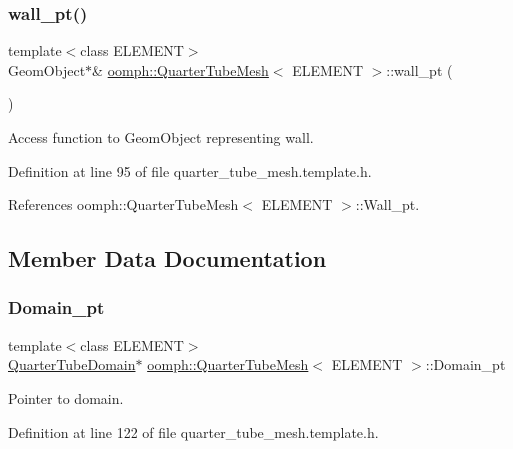 \subsubsection{\texorpdfstring{wall\+\_\+pt()}{wall\_pt()}}
{\footnotesize\ttfamily template$<$class E\+L\+E\+M\+E\+NT$>$ \\
Geom\+Object$\ast$\& \hyperlink{classoomph_1_1QuarterTubeMesh}{oomph\+::\+Quarter\+Tube\+Mesh}$<$ E\+L\+E\+M\+E\+NT $>$\+::wall\+\_\+pt (\begin{DoxyParamCaption}{ }\end{DoxyParamCaption})\hspace{0.3cm}{\ttfamily [inline]}}



Access function to Geom\+Object representing wall. 



Definition at line 95 of file quarter\+\_\+tube\+\_\+mesh.\+template.\+h.



References oomph\+::\+Quarter\+Tube\+Mesh$<$ E\+L\+E\+M\+E\+N\+T $>$\+::\+Wall\+\_\+pt.



\subsection{Member Data Documentation}
\mbox{\label{classoomph_1_1QuarterTubeMesh_a250577dc1d699b4035a42ddabd84c121}} 
\subsubsection{\texorpdfstring{Domain\+\_\+pt}{Domain\_pt}}
{\footnotesize\ttfamily template$<$class E\+L\+E\+M\+E\+NT$>$ \\
\hyperlink{classoomph_1_1QuarterTubeDomain}{Quarter\+Tube\+Domain}$\ast$ \hyperlink{classoomph_1_1QuarterTubeMesh}{oomph\+::\+Quarter\+Tube\+Mesh}$<$ E\+L\+E\+M\+E\+NT $>$\+::Domain\+\_\+pt\hspace{0.3cm}{\ttfamily [protected]}}



Pointer to domain. 



Definition at line 122 of file quarter\+\_\+tube\+\_\+mesh.\+template.\+h.



